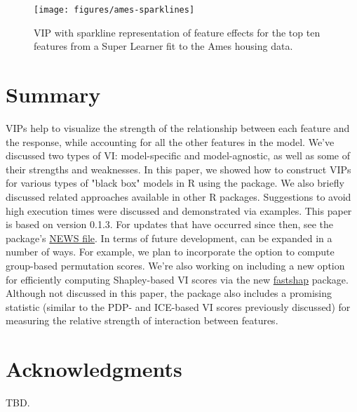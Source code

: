 \begin{figure}[!htb]
  \centering 
  \texttt{[image: figures/ames-sparklines]} 
  \caption{VIP with sparkline representation of feature effects for the top ten features from a Super Learner fit to the Ames housing data.}
  \label{fig:sparklines}
\end{figure}


\section{Summary}

VIPs help to visualize the strength of the relationship between each feature and the response, while accounting for all the other features in the model. We've discussed two types of VI: model-specific and model-agnostic, as well as some of their strengths and weaknesses. In this paper, we showed how to construct VIPs for various types of "black box" models in R using the  package. We also briefly discussed related approaches available in other R packages. Suggestions to avoid high execution times were discussed and demonstrated via examples. This paper is based on  version 0.1.3. For updates that have occurred since then, see the package’s \href{https://cran.r-project.org/web/packages/vip/news/news.html}{NEWS file}. In terms of future development,  can be expanded in a number of ways. For example, we plan to incorporate the option to compute group-based permutation scores. We're also working on including a new option for efficiently computing Shapley-based VI scores via the new \href{https://github.com/bgreenwell/fastshap}{fastshap} package. Although not discussed in this paper, the package also includes a promising statistic (similar to the PDP- and ICE-based VI scores previously discussed) for measuring the relative strength of interaction between features. 


\section{Acknowledgments}

TBD.




